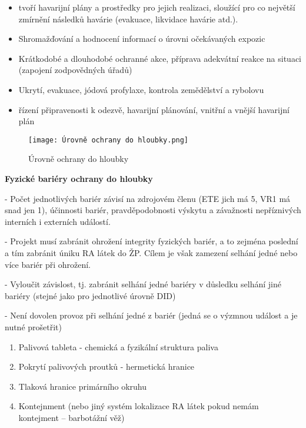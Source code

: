\begin{enumerate}
        \begin{itemize}
            \item tvoří havarijní plány a prostředky pro jejich
realizaci, sloužící pro co největší zmírnění následků havárie (evakuace, likvidace havárie atd.).

            \item Shromažďování a hodnocení informací o úrovni očekávaných expozic

            \item Krátkodobé a dlouhodobé ochranné akce, příprava adekvátní reakce na situaci 
(zapojení zodpovědných úřadů)

            \item Ukrytí, evakuace, jódová profylaxe, kontrola zemědělství a rybolovu

            \item řízení připravenosti k odezvě, havarijní plánování, vnitřní a vnější havarijní plán
        \end{itemize}
\end{enumerate}

\begin{figure}[H]
    \centering
    \texttt{[image: Úrovně ochrany do hloubky.png]}
    \caption{Úrovně ochrany do hloubky}
\end{figure}

\clearpage
\textbf{Fyzické bariéry ochrany do hloubky}

\noindent - Počet jednotlivých bariér závisí na zdrojovém členu (ETE jich má 5, VR1 má snad jen 1), účinnosti bariér, pravděpodobnosti výskytu a závažnosti nepříznivých interních i externích událostí.

\noindent - Projekt musí zabránit ohrožení integrity fyzických bariér, a to zejména poslední a tím zabránit úniku RA látek do ŽP. Cílem je však zamezení selhání jedné nebo více bariér při ohrožení.

\noindent - Vyloučit závislost, tj. zabránit selhání jedné bariéry v důsledku selhání jiné bariéry (stejné jako pro jednotlivé úrovně DID)

\noindent - Není dovolen provoz při selhání jedné z bariér (jedná se o výzmnou událost a je nutné prošetřit)

\begin{enumerate}
	\item Palivová tableta - chemická a fyzikální struktura paliva
	\item Pokrytí palivových proutků - hermetická hranice
	\item Tlaková hranice primárního okruhu
	\item Kontejnment (nebo jiný systém lokalizace RA látek pokud nemám kontejment -- barbotážní věž)
\end{enumerate}

